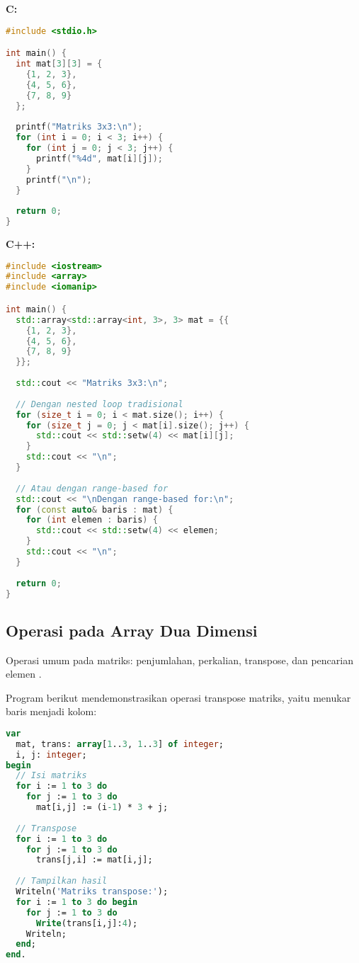 \documentclass[../main.tex]{subfiles}
\begin{document}
\textbf{C:}
\begin{lstlisting}[language=C, caption={Menampilkan array 2D di C}]
#include <stdio.h>

int main() {
  int mat[3][3] = {
    {1, 2, 3},
    {4, 5, 6},
    {7, 8, 9}
  };
  
  printf("Matriks 3x3:\n");
  for (int i = 0; i < 3; i++) {
    for (int j = 0; j < 3; j++) {
      printf("%4d", mat[i][j]);
    }
    printf("\n");
  }
  
  return 0;
}
\end{lstlisting}

\textbf{C++:}
\begin{lstlisting}[language=C++, caption={Menampilkan array 2D di C++}]
#include <iostream>
#include <array>
#include <iomanip>

int main() {
  std::array<std::array<int, 3>, 3> mat = {{
    {1, 2, 3},
    {4, 5, 6},
    {7, 8, 9}
  }};
  
  std::cout << "Matriks 3x3:\n";
  
  // Dengan nested loop tradisional
  for (size_t i = 0; i < mat.size(); i++) {
    for (size_t j = 0; j < mat[i].size(); j++) {
      std::cout << std::setw(4) << mat[i][j];
    }
    std::cout << "\n";
  }
  
  // Atau dengan range-based for
  std::cout << "\nDengan range-based for:\n";
  for (const auto& baris : mat) {
    for (int elemen : baris) {
      std::cout << std::setw(4) << elemen;
    }
    std::cout << "\n";
  }
  
  return 0;
}
\end{lstlisting}

\subsection{Operasi pada Array Dua Dimensi}

Operasi umum pada matriks: penjumlahan, perkalian, transpose, dan pencarian elemen \parencite{geeksforgeeks-matrix-operations}.

Program berikut mendemonstrasikan operasi transpose matriks, yaitu menukar baris menjadi kolom:

\begin{lstlisting}[language=Pascal, caption={Transpose matriks di Pascal}]
var
  mat, trans: array[1..3, 1..3] of integer;
  i, j: integer;
begin
  // Isi matriks
  for i := 1 to 3 do
    for j := 1 to 3 do
      mat[i,j] := (i-1) * 3 + j;
  
  // Transpose
  for i := 1 to 3 do
    for j := 1 to 3 do
      trans[j,i] := mat[i,j];
  
  // Tampilkan hasil
  Writeln('Matriks transpose:');
  for i := 1 to 3 do begin
    for j := 1 to 3 do
      Write(trans[i,j]:4);
    Writeln;
  end;
end.
\end{lstlisting}
\end{document}

